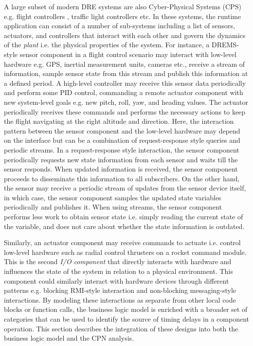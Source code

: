 A large subset of modern DRE systems are also Cyber-Physical Systems (CPS) e.g. flight controllers \cite{sharp1998reducing}, traffic light controllers \cite{huber1998traffic} etc. In these systems, the runtime application can consist of a number of sub-systems including a list of sensors, actuators, and controllers that interact with each other and govern the dynamics of the \emph{plant} i.e. the physical properties of the system. For instance, a DREMS-style sensor component in a flight control scenario may interact with low-level hardware e.g. GPS, inertial measurement units, cameras etc., receive a stream of information, sample sensor state from this stream and publish this information at a defined period. A high-level controller may receive this sensor data periodically and perform some PID control, commanding a remote actuator component with new system-level goals e.g. new pitch, roll, yaw, and heading values. The actuator periodically receives these commands and performs the necessary actions to keep the flight navigating at the right altitude and direction. Here, the interaction pattern between the sensor component and the low-level hardware may depend on the interface but can be a combination of request-response style queries and periodic streams. In a request-response style interaction, the sensor component periodically requests new state information from each sensor and waits till the sensor responds. When updated information is received, the sensor component proceeds to disseminate this information to all subscribers. On the other hand, the sensor may receive a periodic stream of updates from the sensor device itself, in which case, the sensor component samples the updated state variables periodically and publishes it. When using streams, the sensor component performs less work to obtain sensor state i.e. simply reading the current state of the variable, and does not care about whether the state information is outdated. 

Similarly, an actuator component may receive commands to actuate i.e. control low-level hardware such as radial control thrusters on a rocket command module. This is the second \emph{I/O component} that directly interacts with hardware and influences the state of the system in relation to a physical environment. This component could similarly interact with hardware devices through different patterns e.g. blocking RMI-style interaction and non-blocking messaging-style interactions. By modeling these interactions as separate from other local code blocks or function calls, the business logic model is enriched with a broader set of categories that can be used to identify the source of timing delays in a component operation. This section describes the integration of these designs into both the business logic model and the CPN analysis. 

  

